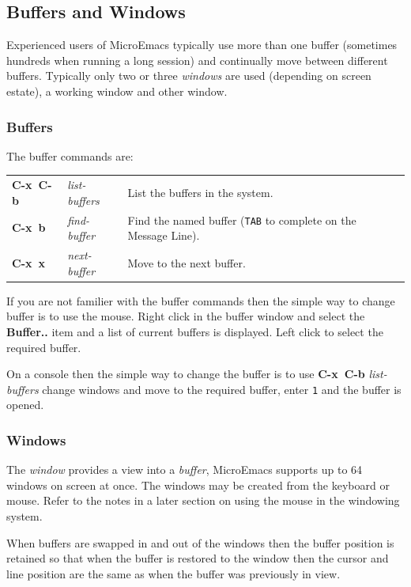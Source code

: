 \documentclass[11pt,a4paper,pdftex]{article}
\begin{document}
\subsection{Buffers and Windows}

  Experienced users of MicroEmacs typically use more than one buffer
  (sometimes hundreds when running a long session) and continually move
  between different buffers. Typically only two or three \textit{windows} are
  used (depending on screen estate), a working window and other window.

\subsubsection{Buffers}

  The buffer commands are:

  \begin{longtable}{ll@{\ --\ }l}
    \endhead
    \endfoot
    \endlastfoot
    \textbf{C-x~C-b} & \textit{list-buffers} &
    List the buffers in the system.\\
    \textbf{C-x~b} & \textit{find-buffer} &
    Find the named buffer (\texttt{TAB} to complete on the Message Line).\\
    \textbf{C-x~x} & \textit{next-buffer} &
    Move to the next buffer.\\
  \end{longtable}

  If you are not familier with the buffer commands then the simple way to
  change buffer is to use the mouse. Right click in the buffer window and
  select the \textbf{Buffer..} item and a list of current buffers is
  displayed. Left click to select the required buffer.

  On a console then the simple way to change the buffer is to use
  \textbf{C-x~C-b} \textit{list-buffers} change windows and move to the
  required buffer, enter \texttt{1} and the buffer is opened.

\subsubsection{Windows}

  The \textit{window} provides a view into a \textit{buffer}, MicroEmacs
  supports up to 64 windows on screen at once. The windows may be created from
  the keyboard or mouse. Refer to the notes in a later section on using the
  mouse in the windowing system.

  When buffers are swapped in and out of the windows then the buffer position
  is retained so that when the buffer is restored to the window then the
  cursor and line position are the same as when the buffer was previously in
  view.
\end{document}
